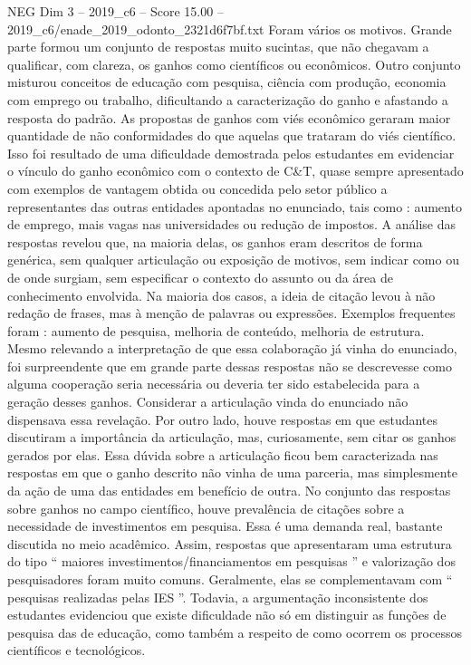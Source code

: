 \begin{textsample}{NEG Dim 3 – 2019\_c6 – Score 15.00 – 2019\_c6/enade\_2019\_odonto\_2321d6f7bf.txt}
Foram vários os motivos.
Grande parte formou um conjunto de respostas muito sucintas, que não chegavam a qualificar, com clareza, os ganhos como científicos ou econômicos.
Outro conjunto misturou conceitos de educação com pesquisa, ciência com produção, economia com emprego ou trabalho, dificultando a caracterização do ganho e afastando a resposta do padrão.
As propostas de ganhos com viés econômico geraram maior quantidade de não conformidades do que aquelas que trataram do viés científico.
Isso foi resultado de uma dificuldade demostrada pelos estudantes em evidenciar o vínculo do ganho econômico com o contexto de C\&T, quase sempre apresentado com exemplos de vantagem obtida ou concedida pelo setor público a representantes das outras entidades apontadas no enunciado, tais como : aumento de emprego, mais vagas nas universidades ou redução de impostos.
A análise das respostas revelou que, na maioria delas, os ganhos eram descritos de forma genérica, sem qualquer articulação ou exposição de motivos, sem indicar como ou de onde surgiam, sem especificar o contexto do assunto ou da área de conhecimento envolvida.
Na maioria dos casos, a ideia de citação levou à não redação de frases, mas à menção de palavras ou expressões.
Exemplos frequentes foram : aumento de pesquisa, melhoria de conteúdo, melhoria de estrutura.
Mesmo relevando a interpretação de que essa colaboração já vinha do enunciado, foi surpreendente que em grande parte dessas respostas não se descrevesse como alguma cooperação seria necessária ou deveria ter sido estabelecida para a geração desses ganhos.
Considerar a articulação vinda do enunciado não dispensava essa revelação.
Por outro lado, houve respostas em que estudantes discutiram a importância da articulação, mas, curiosamente, sem citar os ganhos gerados por elas.
Essa dúvida sobre a articulação ficou bem caracterizada nas respostas em que o ganho descrito não vinha de uma parceria, mas simplesmente da ação de uma das entidades em benefício de outra.
No conjunto das respostas sobre ganhos no campo científico, houve prevalência de citações sobre a necessidade de investimentos em pesquisa.
Essa é uma demanda real, bastante discutida no meio acadêmico.
Assim, respostas que apresentaram uma estrutura do tipo “ maiores investimentos/financiamentos em pesquisas ” e valorização dos pesquisadores foram muito comuns.
Geralmente, elas se complementavam com “ pesquisas realizadas pelas IES ”.
Todavia, a argumentação inconsistente dos estudantes evidenciou que existe dificuldade não só em distinguir as funções de pesquisa das de educação, como também a respeito de como ocorrem os processos científicos e tecnológicos.

\end{textsample}
